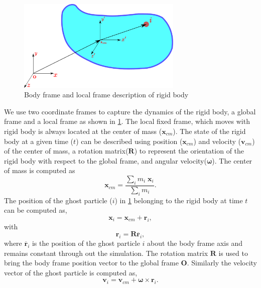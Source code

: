\documentclass[preprint,12pt]{elsarticle}
\newcommand{\teng}[1]{\ensuremath{\boldsymbol{#1}}}
\newcommand{\ten}[1]{\ensuremath{\mathbf{#1}}}
\begin{document}
\begin{figure}[!htpb]
  \centering
  \includegraphics[width=0.7\textwidth]{images/rigid_body/rigid_body}
  \caption{Body frame and local frame description of rigid body}
  \label{fig:gloabl_body_frame_rb}
\end{figure}
We use two coordinate frames to capture the dynamics of the rigid body, a
global frame and a local frame as shown in
\cref{fig:gloabl_body_frame_rb}. The local fixed frame, which moves with
rigid body is always located at the center of mass ($\ten{x}_{cm}$). The
state of the rigid body at a given time ($t$) can be described using position
($\ten{x}_{cm}$) and velocity ($\ten{v}_{cm}$) of the center of mass, a
rotation matrix($\ten{R}$) to represent the orientation of the rigid body with
respect to the global frame, and angular velocity($\teng{\omega}$). The center
of mass is computed as
\begin{equation}
  \label{eq:rfc:center_of_mass}
  \ten{x}_{cm} = \frac{\sum_i m_i \; \ten{x}_{i} }{\sum_i m_i }.
\end{equation}
The position of the ghost particle ($i$) in
\cref{fig:gloabl_body_frame_rb} belonging to the rigid body at time $t$ can be
computed as,
\begin{equation}
  \label{eq:rfc:rb_particle_pos_update}
  \ten{x}_i = \ten{x}_{cm} + \ten{r}_{i},
\end{equation}
with
\begin{equation}
  \label{eq:rfc:rb_particle_pos_update}
  \ten{r}_i = \ten{R} \overline{\ten{r}}_{i},
\end{equation}
where $\overline{\ten{r}}_{i}$ is the position of the ghost particle $i$ about
the body frame axis and remains constant through out the simulation. The
rotation matrix $\ten{R}$ is used to bring the body frame position vector to
the global frame $\ten{O}$. Similarly the velocity vector of the ghost
particle is computed as,
\begin{equation}
  \label{eq:rfc:rb_particle_vel_update}
  \ten{v}_i = \ten{v}_{cm} + \teng{\omega} \times \ten{r}_{i}.
\end{equation}
\end{document}
